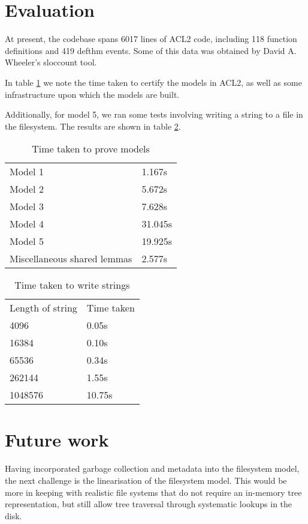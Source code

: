 \documentclass[format=sigconf,review=true]{acmart}
\begin{document}
\section{Evaluation}
At present, the codebase spans 6017 lines of ACL2 code, including 118
function definitions and 419 defthm events. Some of this data was
obtained by David A. Wheeler's sloccount tool.

In table \ref{certification-timing-table} we note the time taken to certify
the models in ACL2, as well as some infrastructure upon which the
models are built.

Additionally, for model 5, we ran some tests involving writing a
string to a file in the filesystem. The results are shown in table
\ref{write-timing-table}.

\begin{table}[]
  \centering
  \caption{Time taken to prove models}
  \label{certification-timing-table}
  \begin{tabular}{ll}
    Model 1 & 1.167s \\
    Model 2 & 5.672s \\
    Model 3 & 7.628s \\
    Model 4 & 31.045s \\
    Model 5 & 19.925s \\
    Miscellaneous shared lemmas & 2.577s \\
  \end{tabular}
\end{table}

\begin{table}[]
\centering
\caption{Time taken to write strings}
\label{write-timing-table}
\begin{tabular}{ll}
Length of string    & Time taken  \\
4096    & 0.05s  \\
16384   & 0.10s  \\
65536   & 0.34s  \\
262144  & 1.55s  \\
1048576 & 10.75s
\end{tabular}
\end{table}

\section{Future work}
Having incorporated garbage collection and metadata into the
filesystem model, the next challenge is the linearisation of the
filesystem model. This would be more in keeping
with realistic file systems that do not require an in-memory tree
representation, but still allow tree traversal through systematic
lookups in the disk.
\end{document}
